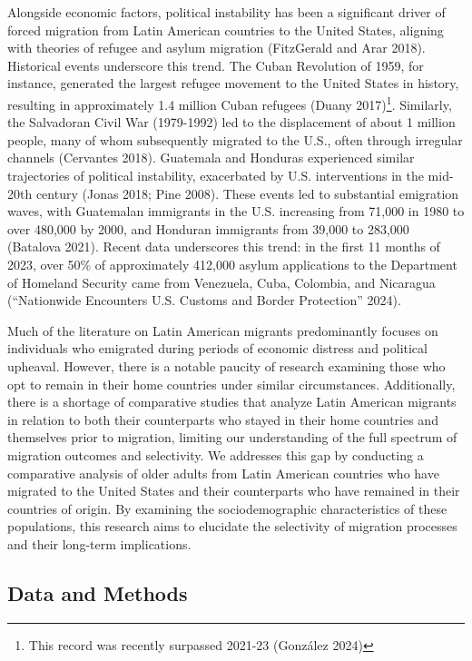 \documentclass[
]{article}
\begin{document}
Alongside economic factors, political instability has been a significant
driver of forced migration from Latin American countries to the United
States, aligning with theories of refugee and asylum migration
(FitzGerald and Arar 2018). Historical events underscore this trend. The
Cuban Revolution of 1959, for instance, generated the largest refugee
movement to the United States in history, resulting in approximately 1.4
million Cuban refugees (Duany 2017)\footnote{This record was recently
  surpassed 2021-23 (González 2024)}. Similarly, the Salvadoran Civil
War (1979-1992) led to the displacement of about 1 million people, many
of whom subsequently migrated to the U.S., often through irregular
channels (Cervantes 2018). Guatemala and Honduras experienced similar
trajectories of political instability, exacerbated by U.S. interventions
in the mid-20th century (Jonas 2018; Pine 2008). These events led to
substantial emigration waves, with Guatemalan immigrants in the U.S.
increasing from 71,000 in 1980 to over 480,000 by 2000, and Honduran
immigrants from 39,000 to 283,000 (Batalova 2021). Recent data
underscores this trend: in the first 11 months of 2023, over 50\% of
approximately 412,000 asylum applications to the Department of Homeland
Security came from Venezuela, Cuba, Colombia, and Nicaragua
({``Nationwide {Encounters} {\textbar} {U}.{S}. {Customs} and {Border}
{Protection}''} 2024).

Much of the literature on Latin American migrants predominantly focuses
on individuals who emigrated during periods of economic distress and
political upheaval. However, there is a notable paucity of research
examining those who opt to remain in their home countries under similar
circumstances. Additionally, there is a shortage of comparative studies
that analyze Latin American migrants in relation to both their
counterparts who stayed in their home countries and themselves prior to
migration, limiting our understanding of the full spectrum of migration
outcomes and selectivity. We addresses this gap by conducting a
comparative analysis of older adults from Latin American countries who
have migrated to the United States and their counterparts who have
remained in their countries of origin. By examining the sociodemographic
characteristics of these populations, this research aims to elucidate
the selectivity of migration processes and their long-term implications.

\subsection{Data and Methods}\label{sec-methods}
\end{document}
